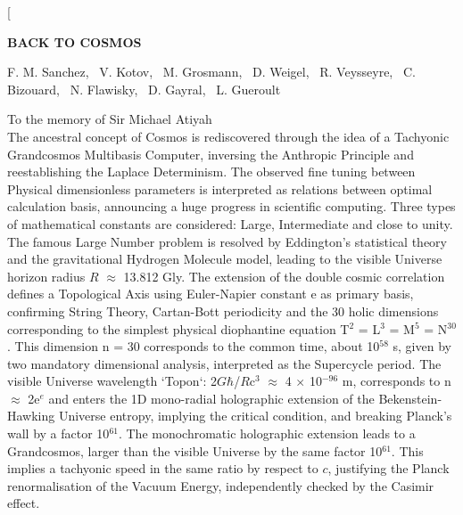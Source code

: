 \documentclass[twoside,draft]{article}
\begin{document}
\begin{sloppypar}

\renewcommand{\refname}{References}
\renewcommand{\tablename}{\small Table}
\renewcommand{\figurename}{\small Fig.}
\renewcommand{\contentsname}{Contents}


\twocolumn[%
\begin{center}
\renewcommand{\baselinestretch}{0.93}
{\Large\bfseries BACK TO COSMOS

}\par
\renewcommand{\baselinestretch}{1.0}
\bigskip
F. M. Sanchez, \ V. Kotov, \ M. Grosmann, \ D. Weigel, \ R. Veysseyre, \ C. Bizouard, \ N. Flawisky, \ D. Gayral, \ L. Gueroult\\
\par
\medskip
{\small\parbox{11cm}{%
\hfill To the memory of Sir Michael Atiyah\\
The ancestral concept of Cosmos is rediscovered through the idea of a Tachyonic Grandcosmos Multibasis Computer, inversing the Anthropic Principle and reestablishing the Laplace Determinism.
The observed fine tuning between Physical dimensionless parameters is interpreted as relations between optimal calculation basis, announcing a huge progress in scientific computing.
Three types of mathematical constants are considered: Large, Intermediate and close to unity. The famous Large Number problem is resolved by Eddington's statistical theory and the gravitational Hydrogen Molecule model, leading to the visible Universe horizon radius $R$ $\approx$ 13.812 Gly.
The extension of the double cosmic correlation defines a Topological Axis using Euler-Napier constant e as primary basis, confirming String Theory, Cartan-Bott periodicity and the 30 holic dimensions corresponding to the simplest physical diophantine equation T$^2\!$ = L$^3\!$ = M$^5\!$ = N$^{30}\!$.
This dimension n = 30 corresponds to the common time, about 10$^{58}\!$ s, given by two mandatory dimensional analysis, interpreted as the Supercycle period.
The visible Universe wavelength `Topon`: 2$G$$\hbar$/$R$c$^3\!$ $\approx$ 4 $\times$ 10$^{-96}\!$ m, corresponds to n $\approx$ 2e$^e\!$ and enters the 1D mono-radial holographic extension of the Bekenstein-Hawking Universe entropy, implying the critical condition, and breaking Planck's wall by a factor 10$^{61}\!$.
The monochromatic holographic extension leads to a Grandcosmos, larger than the visible Universe by the same factor 10$^{61}\!$.
This implies a tachyonic speed in the same ratio by respect to $c$, justifying the Planck renormalisation of the Vacuum Energy, independently checked by the Casimir effect.
$$}}
\end{center}
\end{sloppypar}
\end{document}
